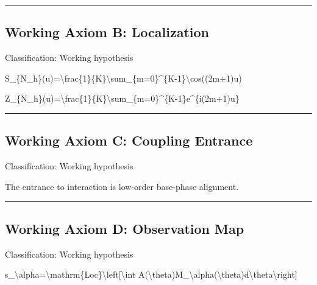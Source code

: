 \documentclass[
  a4paper,
]{article}
\newenvironment{Shaded}{}{}
\newcommand{\NormalTok}[1]{#1}
\begin{document}
\begin{center}\rule{0.5\linewidth}{0.5pt}\end{center}

\subsection{Working Axiom B:
Localization}\label{working-axiom-b-localization}

Classification: Working hypothesis

\begin{Shaded}
\begin{Highlighting}[]
\NormalTok{S\_\{N\_h\}(u)=\textbackslash{}frac\{1\}\{K\}\textbackslash{}sum\_\{m=0\}\^{}\{K{-}1\}\textbackslash{}cos((2m+1)u)}
\end{Highlighting}
\end{Shaded}

\begin{Shaded}
\begin{Highlighting}[]
\NormalTok{Z\_\{N\_h\}(u)=\textbackslash{}frac\{1\}\{K\}\textbackslash{}sum\_\{m=0\}\^{}\{K{-}1\}e\^{}\{i(2m+1)u\}}
\end{Highlighting}
\end{Shaded}

\begin{center}\rule{0.5\linewidth}{0.5pt}\end{center}

\subsection{Working Axiom C: Coupling
Entrance}\label{working-axiom-c-coupling-entrance}

Classification: Working hypothesis

The entrance to interaction is low-order base-phase alignment.

\begin{center}\rule{0.5\linewidth}{0.5pt}\end{center}

\subsection{Working Axiom D: Observation
Map}\label{working-axiom-d-observation-map}

Classification: Working hypothesis

\begin{Shaded}
\begin{Highlighting}[]
\NormalTok{s\_\textbackslash{}alpha=\textbackslash{}mathrm\{Loc\}\textbackslash{}left[\textbackslash{}int A(\textbackslash{}theta)M\_\textbackslash{}alpha(\textbackslash{}theta)d\textbackslash{}theta\textbackslash{}right]}
\end{Highlighting}
\end{Shaded}
\end{document}
